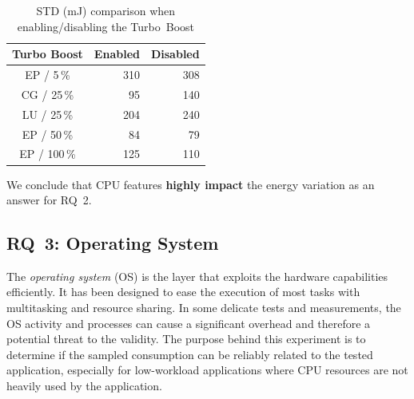 \begin{table}%
    \centering
    \caption{STD (mJ) comparison when enabling/disabling the Turbo~Boost}
    \label{table:turboboost}
    \small
    \begin{tabular}{|c|r|r|}
        \hline
        \textbf{Turbo Boost}  & \textbf{Enabled} & \textbf{Disabled} \\
        \hline
        \hline
        \textsf{EP} / 5\,\%   & 310              & 308               \\
        \hline
        \textsf{CG} / 25\,\%  & 95               & 140               \\
        \hline
        \textsf{LU} / 25\,\%  & 204              & 240               \\
        \hline
        \textsf{EP} / 50\,\%  & 84               & 79                \\
        \hline
        \textsf{EP} / 100\,\% & 125              & 110               \\
        \hline
    \end{tabular}
\end{table}


\begin{mdframed}[skipabove=\topsep,skipbelow=\topsep]
    We conclude that CPU features \textbf{highly impact} the energy variation as an answer for \textsc{RQ~2}.
\end{mdframed}

\subsection{\textsc{RQ}~3: Operating System}
The \emph{operating system} (OS) is the layer that exploits the hardware capabilities efficiently.
It has been designed to ease the execution of most tasks with multitasking and resource sharing.
In some delicate tests and measurements, the OS activity and processes can cause a significant overhead and therefore a potential threat to the validity. %
The purpose behind this experiment is to determine if the sampled consumption can be reliably related to the tested application, especially for low-workload applications where CPU resources are not heavily used by the application.

